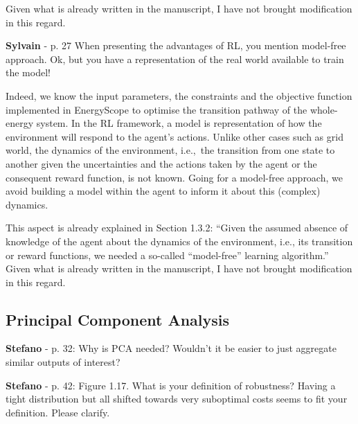 \documentclass[12pt,a4paper]{article}
\def\ie{i.e.,\ }
\begin{document}
Given what is already written in the manuscript, I have not brought modification in this regard.

\begin{mdframed}[style=comment] %
{\color{purple} \textbf{Sylvain}} - p. 27 When presenting the advantages of RL, you mention model-free approach. Ok, but you have a representation of the real world available to train the model!
\end{mdframed}

\noindent Indeed, we know the input parameters, the constraints and the objective function implemented in EnergyScope to optimise the transition pathway of the whole-energy system. In the RL framework, a model is representation of how the environment will respond to the agent's actions. Unlike other cases such as grid world, the dynamics of the environment, \ie the transition from one state to another given the uncertainties and the actions taken by the agent or the consequent reward function, is not known.  Going for a model-free approach, we avoid building a model within the agent to inform it about this (complex) dynamics.

This aspect is already explained in Section 1.3.2: ``Given the assumed absence of knowledge of the agent about the dynamics of the environment, i.e., its transition or reward functions, we needed a so-called ``model-free'' learning algorithm.'' Given what is already written in the manuscript, I have not brought modification in this regard.

\subsection{Principal Component Analysis}
\label{methodo_PCA}

\begin{mdframed}[style=comment] %
{\color{orange} \textbf{Stefano}} - p. 32: Why is PCA needed? Wouldn’t it be easier to just aggregate similar outputs of interest?
\end{mdframed}

\noindent 

\begin{mdframed}[style=manuscript] %

\end{mdframed}

\begin{mdframed}[style=comment] %
{\color{orange} \textbf{Stefano}} - p. 42: Figure 1.17. What is your definition of robustness? Having a tight distribution but all shifted towards very suboptimal costs seems to fit your definition. Please clarify.
\end{mdframed}
\end{document}

